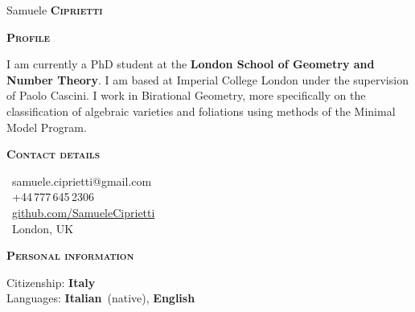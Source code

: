 \documentclass[11pt, a4paper]{article}
\newcommand{\headleft}[1]{\vspace*{3ex}\textsc{\textbf{#1}}\par%
    \vspace*{-1.5ex}\hrulefill\par\vspace*{0.7ex}}
\begin{document}
\setlength{\topskip}{0pt}
\setlength{\parindent}{0pt}
\setlength{\parskip}{0pt}
\setlength{\fboxsep}{0pt}
\pagestyle{empty}
\raggedbottom

\begin{minipage}[t]{0.33\textwidth} %
\colorbox{cvblue}{\begin{minipage}[t][5mm][t]{\textwidth}\null\hfill\null\end{minipage}}

\vspace{-.2ex} %
\colorbox{cvblue!90}{\color{white}  %
\textwidth\relax%
\begin{minipage}[t][293mm][t]{0.82\textwidth}
\raggedright
\vspace*{2.5ex}

\Large Samuele \textbf{\textsc{Ciprietti}} \normalsize 


\vspace*{0.5ex} %

\headleft{Profile}
I am currently a PhD student at the \textbf{London School of Geometry and Number Theory}. I am based at Imperial College London under the supervision of Paolo Cascini. I work in Birational Geometry, more specifically on the classification of algebraic varieties and foliations using methods of the Minimal Model Program.

\headleft{Contact details}
\small %
\MVAt\ {\small samuele.ciprietti@gmail.com} \\[0.4ex]
\Mobilefone\ +44\,777\,645\,2306 \\[0.5ex]
\Mundus\ \href{https://github.com/SamueleCiprietti}{github.com/SamueleCiprietti} \\[0.1ex]
\Letter\ London, UK
\normalsize

\headleft{Personal information}
Citizenship: \textbf{Italy} \\[0.5ex]
Languages: \textbf{Italian}~(native), \textbf{English}


\end{minipage}%
\textwidth\relax%
}
\end{minipage}%
\end{document}
